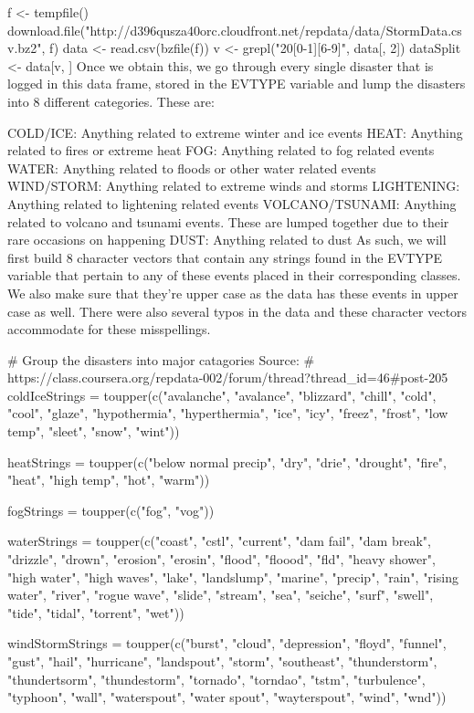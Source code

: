 f <- tempfile()
download.file("http://d396qusza40orc.cloudfront.net/repdata/data/StormData.csv.bz2", 
    f)
data <- read.csv(bzfile(f))
v <- grepl("20[0-1][6-9]", data[, 2])
dataSplit <- data[v, ]
Once we obtain this, we go through every single disaster that is logged in this data frame, stored in the EVTYPE variable and lump the disasters into 8 different categories. These are:

COLD/ICE: Anything related to extreme winter and ice events
HEAT: Anything related to fires or extreme heat
FOG: Anything related to fog related events
WATER: Anything related to floods or other water related events
WIND/STORM: Anything related to extreme winds and storms
LIGHTENING: Anything related to lightening related events
VOLCANO/TSUNAMI: Anything related to volcano and tsunami events. These are lumped together due to their rare occasions on happening
DUST: Anything related to dust
As such, we will first build 8 character vectors that contain any strings found in the EVTYPE variable that pertain to any of these events placed in their corresponding classes. We also make sure that they're upper case as the data has these events in upper case as well. There were also several typos in the data and these character vectors accommodate for these misspellings.

# Group the disasters into major catagories Source:
# https://class.coursera.org/repdata-002/forum/thread?thread_id=46#post-205
coldIceStrings = toupper(c("avalanche", "avalance", "blizzard", "chill", "cold", 
    "cool", "glaze", "hypothermia", "hyperthermia", "ice", "icy", "freez", "frost", 
    "low temp", "sleet", "snow", "wint"))

heatStrings = toupper(c("below normal precip", "dry", "drie", "drought", "fire", 
    "heat", "high temp", "hot", "warm"))

fogStrings = toupper(c("fog", "vog"))

waterStrings = toupper(c("coast", "cstl", "current", "dam fail", "dam break", 
    "drizzle", "drown", "erosion", "erosin", "flood", "floood", "fld", "heavy shower", 
    "high water", "high waves", "lake", "landslump", "marine", "precip", "rain", 
    "rising water", "river", "rogue wave", "slide", "stream", "sea", "seiche", 
    "surf", "swell", "tide", "tidal", "torrent", "wet"))

windStormStrings = toupper(c("burst", "cloud", "depression", "floyd", "funnel", 
    "gust", "hail", "hurricane", "landspout", "storm", "southeast", "thunderstorm", 
    "thundertsorm", "thundestorm", "tornado", "torndao", "tstm", "turbulence", 
    "typhoon", "wall", "waterspout", "water spout", "wayterspout", "wind", "wnd"))

